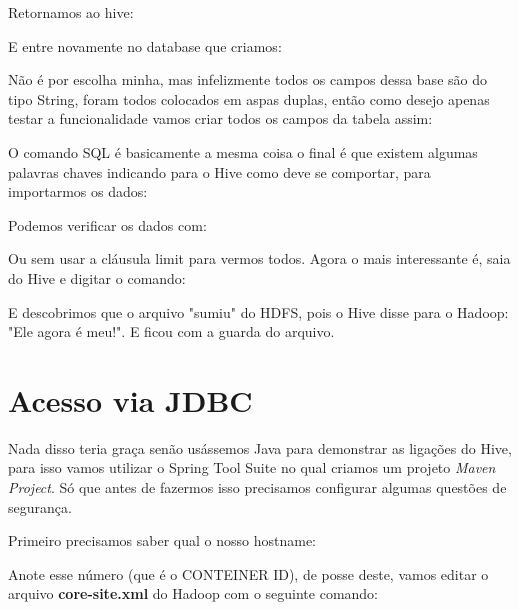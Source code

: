 \documentclass[a4paper,11pt]{article}
\begin{document}
Retornamos ao hive: \\

E entre novamente no database que criamos: \\

Não é por escolha minha, mas infelizmente todos os campos dessa base são do tipo String, foram todos colocados em aspas duplas, então como desejo apenas testar a funcionalidade vamos criar todos os campos da tabela assim: \\

O comando SQL é basicamente a mesma coisa o final é que existem algumas palavras chaves indicando para o Hive como deve se comportar, para importarmos os dados: \\

Podemos verificar os dados com: \\

Ou sem usar a cláusula limit para vermos todos. Agora o mais interessante é, saia do Hive e digitar o comando: \\

E descobrimos que o arquivo "sumiu" do HDFS, pois o Hive disse para o Hadoop: "Ele agora é meu!". E ficou com a guarda do arquivo.

\section{Acesso via JDBC}
Nada disso teria graça senão usássemos Java para demonstrar as ligações do Hive, para isso vamos utilizar o Spring Tool Suite no qual criamos um projeto \textit{Maven Project}. Só que antes de fazermos isso precisamos configurar algumas questões de segurança.

Primeiro precisamos saber qual o nosso hostname: \\

Anote esse número (que é o CONTEINER ID), de posse deste, vamos editar o arquivo \textbf{core-site.xml} do Hadoop com o seguinte comando: \\
\end{document}

